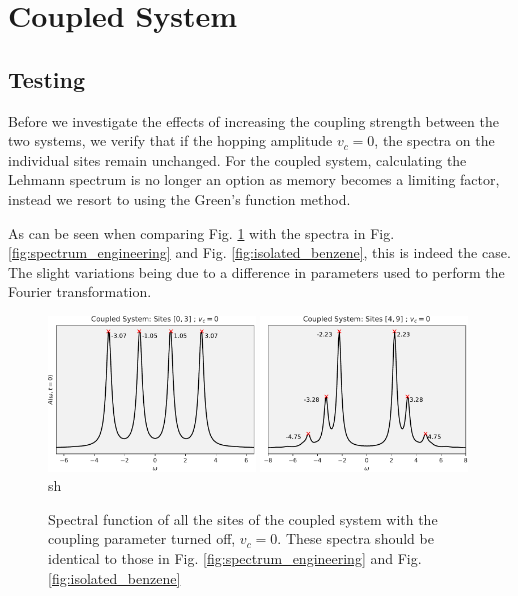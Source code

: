 \section{Coupled System}

\subsection{Testing}
Before we investigate the effects of increasing the coupling strength between the two systems, we verify that if the hopping amplitude $v_c = 0$, the spectra on the individual sites remain unchanged. For the coupled system, calculating the Lehmann spectrum is no longer an option as memory becomes a limiting factor, instead we resort to using the Green's function method.

\medskip
As can be seen when comparing Fig. \ref{fig:coupled_vc_0} with the spectra in Fig. \ref{fig:spectrum_engineering} and Fig. \ref{fig:isolated_benzene}, this is indeed the case. The slight variations being due to a difference in parameters used to perform the Fourier transformation.

\begin{figure}[!hbt]
    \centering
    \includegraphics[width=0.49\textwidth]{graph/coupled_QD_vc_0.pdf}
    \includegraphics[width=0.49\textwidth]{graph/coupled_benzene_vc_0.pdf}sh
    \caption{Spectral function of all the sites of the coupled system with the coupling parameter turned off, $v_c = 0$. These spectra should be identical to those in Fig. \ref{fig:spectrum_engineering} and Fig. \ref{fig:isolated_benzene}}
    \label{fig:coupled_vc_0}
\end{figure}

